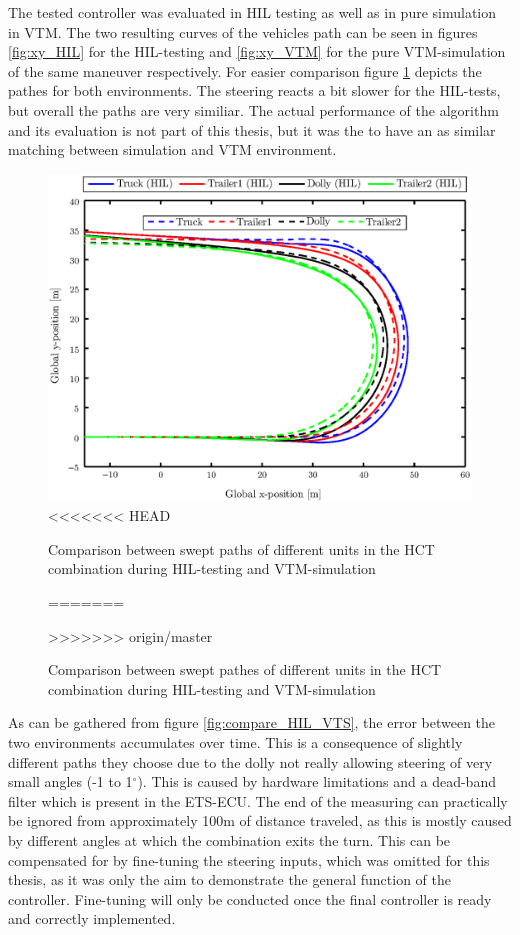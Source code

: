 \documentclass[ExampleMasters.tex]{subfiles}
\begin{document}
The tested controller was evaluated in \gls{HIL} testing as well as in pure simulation in \gls{VTM}. The two resulting curves of the vehicles path can be seen in figures \ref{fig:xy_HIL} for the \gls{HIL}-testing and \ref{fig:xy_VTM} for the pure \gls{VTM}-simulation of the same maneuver respectively. For easier comparison figure \ref{fig:xy_HIL_and_VTM} depicts the pathes for both environments. The steering reacts a bit slower for the \gls{HIL}-tests, but overall the paths are very similiar. The actual performance of the algorithm and its evaluation is not part of this thesis, but it was the to have an as similar matching between simulation and \gls{VTM} environment.


\begin{figure}[!htb]
	\centering
	\includegraphics[width=1\linewidth]{figures/xy_HIL_and_VTM}
<<<<<<< HEAD
	\caption{Comparison between swept paths of different units in the \acrshort{HCT} combination during \acrlong{HIL}-testing and \acrshort{VTM}-simulation}
=======
	\caption{Comparison between swept pathes of different units in the \gls{HCT} combination during \gls{HIL}-testing and \gls{VTM}-simulation}
>>>>>>> origin/master
	
	\label{fig:xy_HIL_and_VTM}
\end{figure}

As can be gathered from figure \ref{fig:compare_HIL_VTS}, the error between the two environments accumulates over time. This is a consequence of slightly different paths they choose due to the dolly not really allowing steering of very small angles (-1 to 1$^\circ$). This is caused by hardware limitations and a dead-band filter which is present in the \gls{ETS}-\gls{ECU}. The end of the measuring can practically be ignored from approximately 100m of distance traveled, as this is mostly caused by different angles at which the combination exits the turn. This can be compensated for by fine-tuning the steering inputs, which was omitted for this thesis, as it was only the aim to demonstrate the general function of the controller. Fine-tuning will only be conducted once the final controller is ready and correctly implemented. 
\end{document}
